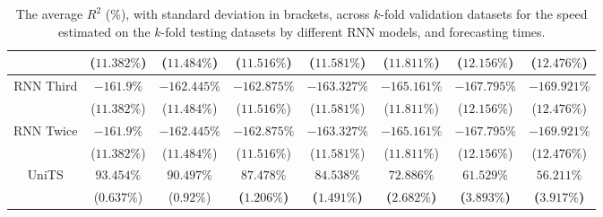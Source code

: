 \begin{table}[!ht]
{\begin{tabular}{|c|c|c|c|c|c|c|c|}
			 & ($11.382\%$) & ($11.484\%$) & ($11.516\%$) & ($11.581\%$) & ($11.811\%$) & ($12.156\%$) & ($12.476\%$) \\ \hline
			\multirow{2}{*}{RNN Third} & $-161.9\%$ & $-162.445\%$ & $-162.875\%$ & $-163.327\%$ & $-165.161\%$ & $-167.795\%$ & $-169.921\%$ \\
			 & ($11.382\%$) & ($11.484\%$) & ($11.516\%$) & ($11.581\%$) & ($11.811\%$) & ($12.156\%$) & ($12.476\%$) \\ \hline
			\multirow{2}{*}{RNN Twice} & $-161.9\%$ & $-162.445\%$ & $-162.875\%$ & $-163.327\%$ & $-165.161\%$ & $-167.795\%$ & $-169.921\%$ \\
			 & ($11.382\%$) & ($11.484\%$) & ($11.516\%$) & ($11.581\%$) & ($11.811\%$) & ($12.156\%$) & ($12.476\%$) \\ \hline
			\multirow{2}{*}{UniTS} & $93.454\%$ & $90.497\%$ & $\mathbf{87.478\%}$ & $\mathbf{84.538\%}$ & $\mathbf{72.886\%}$ & $\mathbf{61.529\%}$ & $\mathbf{56.211\%}$ \\
			 & ($0.637\%$) & ($0.92\%$) & \textbf{(}$\mathbf{1.206\%}$\textbf{)} & \textbf{(}$\mathbf{1.491\%}$\textbf{)} & \textbf{(}$\mathbf{2.682\%}$\textbf{)} & \textbf{(}$\mathbf{3.893\%}$\textbf{)} & \textbf{(}$\mathbf{3.917\%}$\textbf{)} \\ \hline
		\end{tabular}
	}
	\caption{The average $R^{2}$ (\%), with standard deviation in brackets, across $k$-fold validation datasets for the speed estimated on the $k$-fold testing datasets by different RNN models, and forecasting times.}
	\label{tab:all_speed_R2}
\end{table}